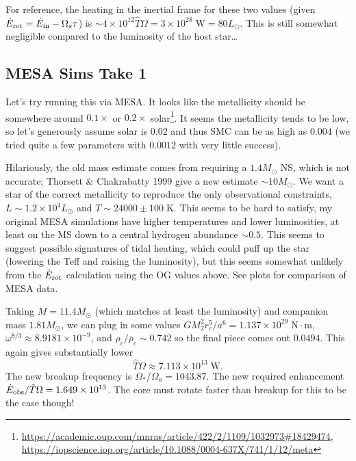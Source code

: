 \documentclass[11pt,
        usenames, %
        dvipsnames %
    ]{article}
\newcommand*{\scinot}[2]{#1\times10^{#2}}
\begin{document}
For reference, the heating in the inertial frame for these two values (given
$\dot{E}_{\rm rot} = \dot{E}_{\rm in} - \Omega_s \tau$) is $\sim \scinot{4}{12}
\hat{T}\Omega = \scinot{3}{28}\;\mathrm{W} = 80L_{\odot}$. This is still
somewhat negligible compared to the luminosity of the host star\dots

\subsection{MESA Sims Take 1}

Let's try running this via MESA\@. It looks like the metallicity should be
somewhere around $0.1\times$ or $0.2\times$ solar\footnote{
\url{https://academic.oup.com/mnras/article/422/2/1109/1032973\#18429474},
\url{https://iopscience.iop.org/article/10.1088/0004-637X/741/1/12/meta}}.%
It seems the metallicity tends to be low, so let's generously assume
solar is $0.02$ and thus SMC can be as high as $0.004$ (we tried quite a few
parameters
with $0.0012$ with very little success).

Hilariously, the old mass estimate
comes from requiring a $1.4M_{\odot}$ NS, which is not accurate; Thorsett \&
Chakrabatty 1999 give a new estimate $\sim 10 M_{\odot}$. We want a star of the
correct metallicity to reproduce the only observational constraints, $L \sim
\scinot{1.2}{4}L_{\odot}$ and $T \sim 24000 \pm 100\;\mathrm{K}$. This seems to
be hard to satisfy, my original MESA simulations have higher temperatures and
lower luminosities, at least on the MS down to a central hydrogen abundance
$\sim 0.5$. This seems to suggest possible signatures of tidal heating, which
could puff up the star (lowering the Teff and raising the luminosity), but this
seems somewhat unlikely from the $\dot{E}_{\rm rot}$ calculation using the OG
values above. See plots for comparison of MESA data. %

Taking $M = 11.4M_{\odot}$ (which matches at least the luminosity) and companion
mass $1.81 M_{\odot}$, we can plug in some values
$GM_2^2 r_c^5 / a^6 = \scinot{1.137}{29}\;\mathrm{N \cdot m}$,
$\omega^{8/3} \approx \scinot{8.9181}{-9}$, and
$\rho_c / \bar{\rho}_c \sim 0.742$ so the final piece comes out $0.0494$. This
again gives substantially lower
\begin{equation}
    \hat{T}\Omega \approx \scinot{7.113}{13}\;\mathrm{W}.
\end{equation}
The new breakup frequency is $\Omega_* / \Omega_o = 1043.87$. The new required
enhancement $\dot{E}_{\rm obs} / \hat{T}\Omega = \scinot{1.649}{13}$. The core
must rotate faster than breakup for this to be the case though!
\end{document}

